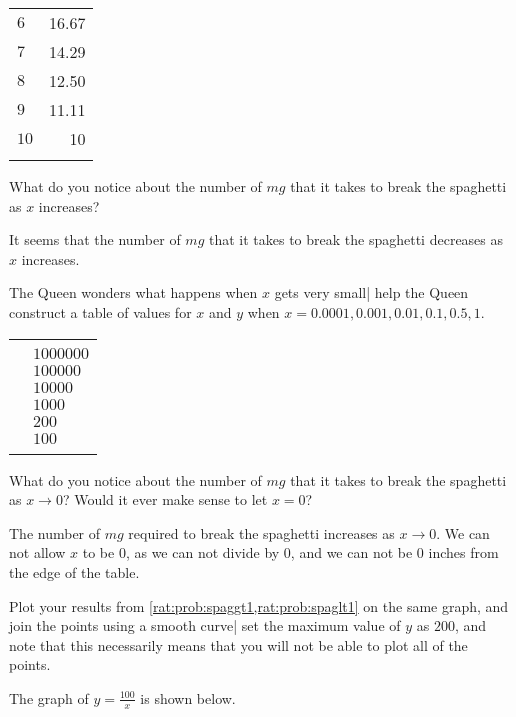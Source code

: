 \begin{problem}
\begin{subproblem}
\begin{shortsolution}
\begin{tabular}[t]{ld{2}}
			$6$						&	16.67	\\\normalline
			$7$						&	14.29\\\normalline
			$8$						&	12.50	\\\normalline
			$9$						&	11.11	\\\normalline
			$10$					& 10		\\\lastline
	\end{tabular}
\end{shortsolution}
\end{subproblem}
\begin{subproblem}
What do you notice about the number of $\unit{mg}$ that it takes to break 
the spaghetti as $x$ increases?
\begin{shortsolution}
It seems that the number of $\unit{mg}$ that it takes to break the spaghetti decreases
as $x$ increases.
\end{shortsolution}
\end{subproblem}
\begin{subproblem}\label{rat:prob:spaglt1}
The Queen wonders what happens when $x$ gets very small| help the Queen construct 
a table of values for $x$ and $y$ when $x=0.0001, 0.001, 0.01, 0.1, 0.5, 1$.
\begin{shortsolution}
\begin{tabular}[t]{d{2}l}
			\beforeheading
				&		\\
						&	$1000000$	\\			&	$100000$	\\			&	$10000$	\\			&	$1000$	\\			&	$200$	\\					& $100$		\\\lastline
	\end{tabular}
\end{shortsolution}
\end{subproblem}
\begin{subproblem}
What do you notice about the number of $\unit{mg}$ that it takes to break the spaghetti
as $x\rightarrow 0$? Would it ever make sense to let $x=0$?
\begin{shortsolution}
The number of $\unit{mg}$ required to break the spaghetti increases as $x\rightarrow 0$.
We can not allow $x$ to be $0$, as we can not divide by $0$, and we can not 
be $0$ inches from the edge of the table.
\end{shortsolution}
\end{subproblem}
\begin{subproblem}
Plot your results from \cref{rat:prob:spaggt1,rat:prob:spaglt1} on the same graph, 
and join the points using a smooth curve| set the maximum value of $y$ as $200$, and 
note that this necessarily means that you will not be able to plot all of the points.
\begin{shortsolution}
The graph of $y=\frac{100}{x}$ is shown below.


\end{shortsolution}
\end{subproblem}
\end{problem}
